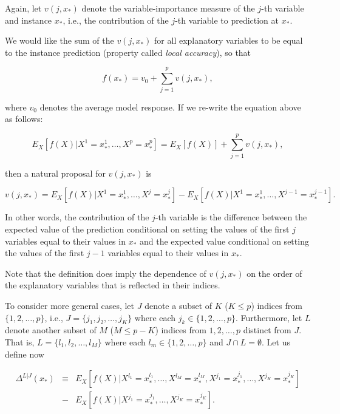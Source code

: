 \documentclass[12pt,]{krantz}
\begin{document}
Again, let \(v(j, x_*)\) denote the variable-importance measure of the \(j\)-th variable and instance \(x_*\), i.e., the contribution of the \(j\)-th variable to prediction at \(x_*\).

We would like the sum of the \(v(j, x_*)\) for all explanatory variables to be equal to the instance prediction (property called \emph{local accuracy}), so that

\begin{equation}
f(x_*) = v_0 + \sum_{j=1}^p v(j, x_*),
\label{eq:generalBreakDownLocalAccuracy}
\end{equation}

where \(v_0\) denotes the average model response. If we re-write the equation above as follows:

\begin{equation}
E_X[f(X)|X^1 = x^1_*, \ldots, X^p = x^p_*] = E_X[f(X)] + \sum_{j=1}^p v(j, x_*),
\end{equation}

then a natural proposal for \(v(j, x_*)\) is

\begin{equation}
v(j, x_*) = E_X[f(X) | X^1 = x^1_*, \ldots, X^j = x^j_*] - E_X[f(X) | X^1 = x^1_*, \ldots, X^{j-1} = x^{j-1}_*]. 
\label{eq:generalBreakDownProposition}
\end{equation}

In other words, the contribution of the \(j\)-th variable is the difference between the expected value of the prediction conditional on setting the values of the first \(j\) variables equal to their values in \(x_*\) and the expected value conditional on setting the values of the first \(j-1\) variables equal to their values in \(x_*\).

Note that the definition does imply the dependence of \(v(j, x_*)\) on the order of the explanatory variables that is reflected in their indices.

To consider more general cases, let \(J\) denote a subset of \(K\) (\(K\leq p\)) indices from \(\{1,2,\ldots,p\}\), i.e., \(J=\{j_1,j_2,\ldots,j_K\}\) where each \(j_k \in \{1,2,\ldots,p\}\). Furthermore, let \(L\) denote another subset of \(M\) (\(M \leq p-K\)) indices from \({1,2,\ldots,p}\) distinct from \(J\). That is, \(L=\{l_1,l_2,\ldots,l_M\}\) where each \(l_m \in \{1,2,\ldots,p\}\) and \(J \cap L = \emptyset\). Let us define now

\begin{eqnarray}
\Delta^{L|J}(x_*) &\equiv& E_X[f(X) | X^{l_1} = x_*^{l_1},\ldots,X^{l_M} = x_*^{l_M},X^{j_1} = x_*^{j_1},\ldots,X^{j_K} = x_*^{j_K}]\\
&-& E_X[f(X) | X^{j_1} = x_*^{j_1},\ldots,X^{j_K} = x_*^{j_K}].
\end{eqnarray}
\end{document}
